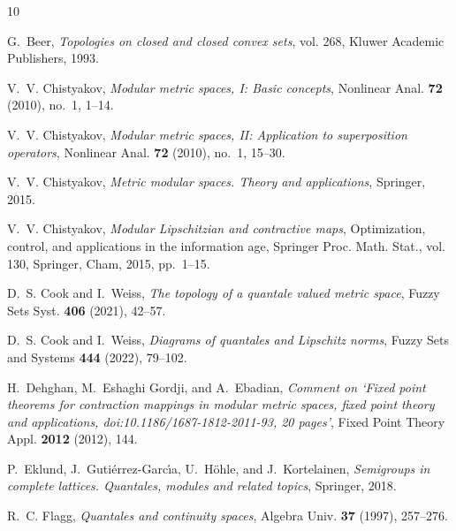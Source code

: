\documentclass[11pt,a4paper]{amsart}
\theoremstyle{definition}
\begin{document}
	
	
	
	
	
	\begin{thebibliography}{10}
		
		G.~Beer, \emph{Topologies on closed and closed convex sets}, vol. 268, Kluwer
		Academic Publishers, 1993.
		
		V.~V. Chistyakov, \emph{Modular metric spaces, {I}: Basic concepts}, Nonlinear
		Anal. \textbf{72} (2010), no.~1, 1--14.
		
		V.~V. Chistyakov, \emph{Modular metric spaces, {II}: {A}pplication to
			superposition operators}, Nonlinear Anal. \textbf{72} (2010), no.~1, 15--30.
		
		V.~V. Chistyakov, \emph{Metric modular spaces. {T}heory and applications},
		Springer, 2015.
		
		V.~V. Chistyakov, \emph{Modular {L}ipschitzian and contractive maps},
		Optimization, control, and applications in the information age, Springer
		Proc. Math. Stat., vol. 130, Springer, Cham, 2015, pp.~1--15.
		
		D.~S. Cook and I.~Weiss, \emph{The topology of a quantale valued metric space},
		Fuzzy Sets Syst. \textbf{406} (2021), 42--57.
		
		D.~S. Cook and I.~Weiss, \emph{Diagrams of quantales and {L}ipschitz norms}, Fuzzy Sets and
		Systems \textbf{444} (2022), 79--102.
		
		H.~Dehghan, M.~Eshaghi Gordji, and A.~Ebadian, \emph{Comment on ‘{F}ixed
			point theorems for contraction mappings in modular metric spaces, fixed point
			theory and applications, doi:10.1186/1687-1812-2011-93, 20 pages’}, Fixed
		Point Theory Appl. \textbf{2012} (2012), 144.
		
		P.~Eklund, J.~Guti\'errez-Garc\'{\i}a, U.~H\"ohle, and J.~Kortelainen,
		\emph{Semigroups in complete lattices. {Q}uantales, modules and related
			topics}, Springer, 2018.
		
		R.~C. Flagg, \emph{Quantales and continuity spaces}, Algebra Univ. \textbf{37}
		(1997), 257--276.
		

\end{thebibliography}
\end{document}
